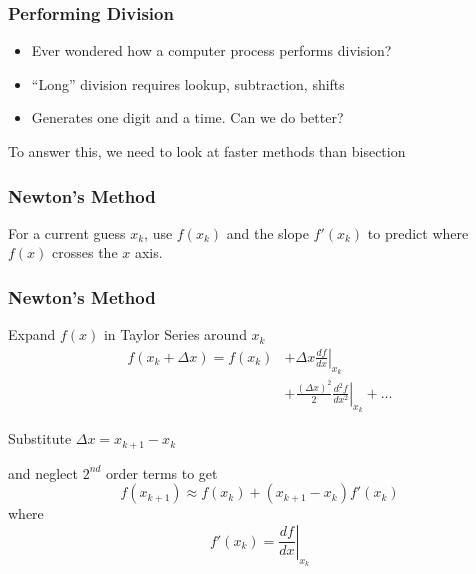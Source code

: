 \documentclass[10pt]{beamer}
\begin{document}
\begin{frame}
\frametitle{Performing Division}
\begin{itemize}
  \item Ever wondered how a computer process performs division?
  \item ``Long'' division requires lookup, subtraction, shifts
  \item Generates one digit and a time.  Can we do better?
\end{itemize}
To answer this, we need to look at faster methods than bisection
\end{frame}
\begin{frame}
\frametitle{Newton's Method}

\vspace{4ex}
\begin{center}
\end{center}

For a current guess $x_k$, use $f(x_k)$ and the slope $f'(x_k)$
to predict where $f(x)$ crosses the $x$ axis.




\end{frame}
\begin{frame}
\frametitle{Newton's Method}


Expand $f(x)$ in Taylor Series around $x_k$
\begin{align*}
    f(x_k + \Delta x) = f(x_k) &+ \Delta x \left. \frac{df}{dx}\right|_{x_k}  \\[4pt]
                               &+ \frac{(\Delta x)^2}{2} \left. \frac{d^2 f}{dx^2}\right|_{x_k}
                                + \ldots
\end{align*}

Substitute $\Delta x = x_{k+1} - x_k$

and neglect $2^{nd}$ order terms to get
\begin{equation*}
	f(x_{k+1}) \approx f(x_k) + \left( x_{k+1} - x_k \right) f'(x_k)
\end{equation*}
where
\begin{equation*}
    f'(x_k) = \left. \frac{df}{dx} \right|_{x_k}
\end{equation*}




\end{frame}
\end{document}
